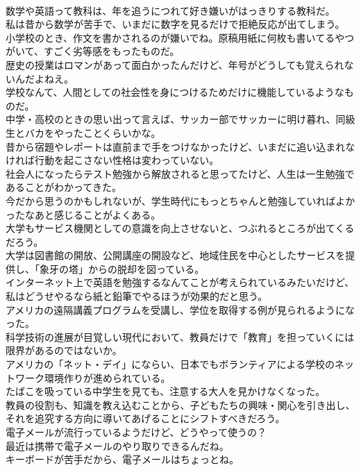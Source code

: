 \documentclass[8pt]{extreport}
\begin{document}
\begin{CJK}{UTF8}{min}
\\	数学や英語って教科は、年を追うにつれて好き嫌いがはっきりする教科だ。	
\\	私は昔から数学が苦手で、いまだに数字を見るだけで拒絶反応が出てしまう。	
\\	小学校のとき、作文を書かされるのが嫌いでね。原稿用紙に何枚も書いてるやつがいて、すごく劣等感をもったものだ。	
\\	歴史の授業はロマンがあって面白かったんだけど、年号がどうしても覚えられないんだよねえ。	
\\	学校なんて、人間としての社会性を身につけるためだけに機能しているようなものだ。	
\\	中学・高校のときの思い出って言えば、サッカー部でサッカーに明け暮れ、同級生とバカをやったことくらいかな。	
\\	昔から宿題やレポートは直前まで手をつけなかったけど、いまだに追い込まれなければ行動を起こさない性格は変わっていない。	
\\	社会人になったらテスト勉強から解放されると思ってたけど、人生は一生勉強であることがわかってきた。	
\\	今だから思うのかもしれないが、学生時代にもっとちゃんと勉強していればよかったなあと感じることがよくある。	
\\	大学もサービス機関としての意識を向上させないと、つぶれるところが出てくるだろう。	
\\	大学は図書館の開放、公開講座の開設など、地域住民を中心としたサービスを提供し、「象牙の塔」からの脱却を図っている。	
\\	インターネット上で英語を勉強するなんてことが考えられているみたいだけど、私はどうせやるなら紙と鉛筆でやるほうが効果的だと思う。	
\\	アメリカの遠隔講義プログラムを受講し、学位を取得する例が見られるようになった。	
\\	科学技術の進展が目覚しい現代において、教員だけで「教育」を担っていくには限界があるのではないか。	
\\	アメリカの「ネット・デイ」にならい、日本でもボランティアによる学校のネットワーク環境作りが進められている。	
\\	たばこを吸っている中学生を見ても、注意する大人を見かけなくなった。	
\\	教員の役割も、知識を教え込むことから、子どもたちの興味・関心を引き出し、それを追究する方向に導いてあげることにシフトすべきだろう。	
\\	電子メールが流行っているようだけど、どうやって使うの？	
\\	最近は携帯で電子メールのやり取りできるんだね。	
\\	キーボードが苦手だから、電子メールはちょっとね。	

\end{CJK}
\end{document}
